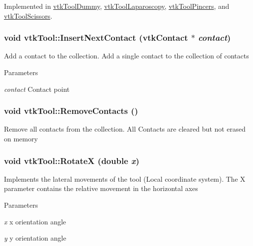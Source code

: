 Implemented in \hyperlink{classvtkToolDummy_aaf4c69a9c0fc3432e678ca9fffc913dc}{vtkToolDummy}, \hyperlink{classvtkToolLaparoscopy_ace75ea21a3ddb27547976ddea0ebb60e}{vtkToolLaparoscopy}, \hyperlink{classvtkToolPincers_ae4918610073324c94dddd8da234742a9}{vtkToolPincers}, and \hyperlink{classvtkToolScissors_a5fc5884ce0fd1723ecf86888bdbba7a6}{vtkToolScissors}.\hypertarget{classvtkTool_ae32bfdeb6ede9c25b0956fad8c15ba98}{
\subsubsection[{InsertNextContact}]{\setlength{\rightskip}{0pt plus 5cm}void vtkTool::InsertNextContact ({\bf vtkContact} $\ast$ {\em contact})}}
\label{classvtkTool_ae32bfdeb6ede9c25b0956fad8c15ba98}


Add a contact to the collection. Add a single contact to the collection of contacts 
\begin{DoxyParams}{Parameters}
\item[{\em contact}]Contact point \end{DoxyParams}
\hypertarget{classvtkTool_a387cd53a14d1d40035f63a255eb57165}{
\subsubsection[{RemoveContacts}]{\setlength{\rightskip}{0pt plus 5cm}void vtkTool::RemoveContacts ()}}
\label{classvtkTool_a387cd53a14d1d40035f63a255eb57165}


Remove all contacts from the collection. All Contacts are cleared but not erased on memory \hypertarget{classvtkTool_a34b408444b681853b5dabbda6b971223}{
\subsubsection[{RotateX}]{\setlength{\rightskip}{0pt plus 5cm}void vtkTool::RotateX (double {\em x})}}
\label{classvtkTool_a34b408444b681853b5dabbda6b971223}


Implements the lateral movements of the tool (Local coordinate system). The X parameter contains the relative movement in the horizontal axes 
\begin{DoxyParams}{Parameters}
\item[{\em x}]x orientation angle \item[{\em y}]y orientation angle \end{DoxyParams}


